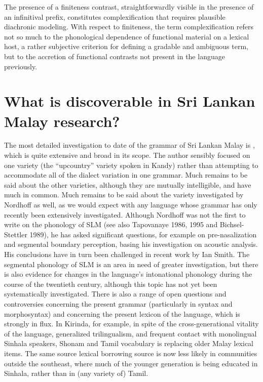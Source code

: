 The presence of a finiteness contrast, straightforwardly visible in the presence of an infinitival prefix, constitutes complexification that requires plausible diachronic modeling. With respect to finiteness, the term complexification refers not so much to the phonological dependence of functional material on a lexical host, a rather subjective criterion for defining a gradable and ambiguous term, but to the accretion of functional contrasts not present in the language previously. 

\section{What is discoverable in Sri Lankan Malay research?}%

The most detailed investigation to date of the grammar of Sri Lankan Malay is \citet{Nordhoff2009}, which is quite extensive and broad in its scope. The author sensibly focused on one variety (the ``upcountry'' variety spoken in Kandy) rather than attempting to accommodate all of the dialect variation in one grammar. Much remains to be said about the other varieties, although they are mutually intelligible, and have much in common. Much remains to be said about the variety investigated by Nordhoff as well, as we would expect with any language whose grammar has only recently been extensively investigated. Although Nordhoff was not the first to write on the phonology of SLM (see also Tapovanaye 1986, 1995 and Bichsel-Stettler 1989), he has asked significant questions, for example on pre-nasalization and segmental boundary perception, basing his investigation on acoustic analysis. His conclusions have in turn been challenged in recent work by Ian Smith. The segmental phonology of SLM is an area in need of greater investigation, but there is also evidence for changes in the language's intonational phonology during the course of the twentieth century, although this topic has not yet been systematically investigated.  There is also a range of open questions and controversies concerning the present grammar (particularly in syntax and morphosyntax) and concerning the present lexicon of the language, which is strongly in flux. In Kirinda, for example, in spite of the cross-generational vitality of the language, generalized trilingualism, and frequent contact with monolingual Sinhala speakers, Shonam and Tamil vocabulary is replacing older Malay lexical items. The same source lexical borrowing source is now less likely in communities outside the southeast, where much of the younger generation is being educated in Sinhala, rather than in (any variety of) Tamil.
